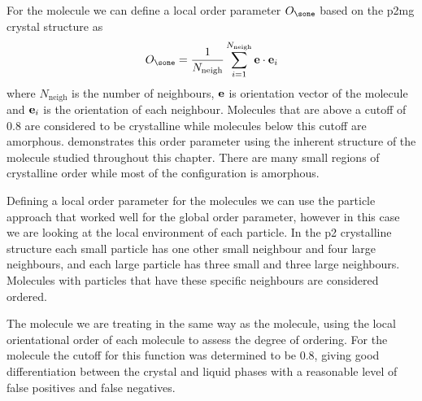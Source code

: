 For the \done molecule we can define a local order parameter $O_\sone$ based on the p2mg crystal structure as
\begin{equation}
    O_{\sone} = \frac{1}{N_{\text{neigh}}}\sum_{i=1}^{N_\text{neigh}} \vect e \cdot \vect e_i
\end{equation}
where $N_\text{neigh}$ is the number of neighbours, $\mathbf{e}$ is orientation vector of the molecule and $\mathbf{e}_i$ is the orientation of each neighbour. Molecules that are above a cutoff of $0.8$ are considered to be crystalline while molecules below this cutoff are amorphous.  demonstrates this order parameter using the inherent structure of the \done molecule studied throughout this chapter. There are many small regions of crystalline order while most of the configuration is amorphous.

Defining a local order parameter for the \dcon molecules we can use the particle approach that worked well for the global order parameter, however in this case we are looking at the local environment of each particle. In the p2 crystalline structure each small particle has one other small neighbour and four large neighbours, and each large particle has three small and three large neighbours. Molecules with particles that have these specific neighbours are considered ordered.

The \tri molecule we are treating in the same way as the \sone molecule, using the local orientational order of each molecule to assess the degree of ordering. For the \tri molecule the cutoff for this function was determined to be 0.8, giving good differentiation between the crystal and liquid phases with a reasonable level of false positives and false negatives.


